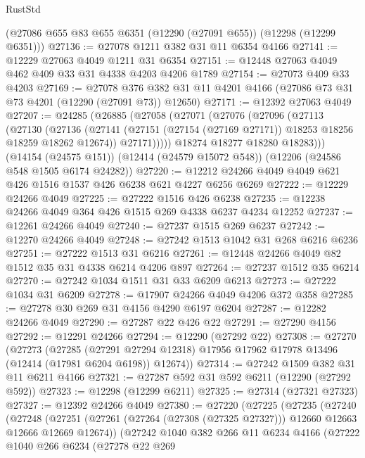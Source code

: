 \begin{lexlean}{RustStd}
\begin{coremodule}
{\begin{coremodule}
{{{{{{{{{{{{{{{{{{{{{{{{{{{{{{{{{{{{{{{{{{{{{{{{{{    (@27086 @655 @83 @655 @6351 (@12290 (@27091 @655)) (@12298 (@12299 @6351)))
@27136 := @27078 @1211 @382 @31 @11 @6354 @4166
@27141 := @12229 @27063 @4049 @1211 @31 @6354
@27151 := @12448 @27063 @4049 @462 @409 @33 @31 @4338 @4203 @4206 @1789
@27154 := @27073 @409 @33 @4203
@27169 := @27078
    @376
    @382
    @31
    @11
    @4201
    @4166
    (@27086 @73 @31 @73 @4201 (@12290 (@27091 @73)) @12650)
@27171 := @12392 @27063 @4049
@27207 := @24285
    (@26885
      (@27058
        (@27071
          (@27076
            (@27096
              (@27113
                (@27130
                  (@27136
                    (@27141 (@27151 (@27154 (@27169 @27171)) @18253 @18256 @18259 @18262 @12674))
                    @27171)))))
          @18274
          @18277
          @18280
          @18283)))
    (@14154 (@24575 @151))
    (@12414 (@24579 @15072 @548))
    (@12206 (@24586 @548 @1505 @6174 @24282))
@27220 := @12212 @24266 @4049 @4049 @621 @426 @1516 @1537 @426 @6238 @621 @4227 @6256 @6269
@27222 := @12229 @24266 @4049
@27225 := @27222 @1516 @426 @6238
@27235 := @12238 @24266 @4049 @364 @426 @1515 @269 @4338 @6237 @4234 @12252
@27237 := @12261 @24266 @4049
@27240 := @27237 @1515 @269 @6237
@27242 := @12270 @24266 @4049
@27248 := @27242 @1513 @1042 @31 @268 @6216 @6236
@27251 := @27222 @1513 @31 @6216
@27261 := @12448 @24266 @4049 @82 @1512 @35 @31 @4338 @6214 @4206 @897
@27264 := @27237 @1512 @35 @6214
@27270 := @27242 @1034 @1511 @31 @33 @6209 @6213
@27273 := @27222 @1034 @31 @6209
@27278 := @17907 @24266 @4049 @4206 @372 @358
@27285 := @27278 @30 @269 @31 @4156 @4290 @6197 @6204
@27287 := @12282 @24266 @4049
@27290 := @27287 @22 @426 @22
@27291 := @27290 @4156
@27292 := @12291 @24266
@27294 := @12290 (@27292 @22)
@27308 := @27270
    (@27273
      (@27285
        (@27291 @27294 @12318)
        @17956
        @17962
        @17978
        @13496
        (@12414 (@17981 @6204 @6198))
        @12674))
@27314 := @27242 @1509 @382 @31 @11 @6211 @4166
@27321 := @27287 @592 @31 @592 @6211 (@12290 (@27292 @592))
@27323 := @12298 (@12299 @6211)
@27325 := @27314 (@27321 @27323)
@27327 := @12392 @24266 @4049
@27380 := @27220
    (@27225
      (@27235
        (@27240
          (@27248
            (@27251 (@27261 (@27264 (@27308 (@27325 @27327))) @12660 @12663 @12666 @12669 @12674))
            (@27242
              @1040
              @382
              @266
              @11
              @6234
              @4166
              (@27222
                @1040
                @266
                @6234
                (@27278
                  @22
                  @269
}}}}}}}}}}}}}}}}}}}}}}}}}}}}}}}}}}}}}}}}}}}}}}}}}}
\end{coremodule}}
\end{coremodule}
\end{lexlean}
